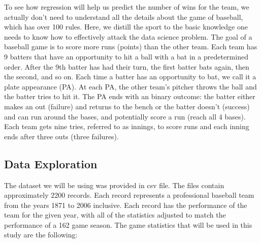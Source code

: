 \documentclass[
]{article}
\begin{document}
To see how regression will help us predict the number of wins for the
team, we actually don't need to understand all the details about the
game of baseball, which has over 100 rules. Here, we distill the sport
to the basic knowledge one needs to know how to effectively attack the
data science problem. The goal of a baseball game is to score more runs
(points) than the other team. Each team has 9 batters that have an
opportunity to hit a ball with a bat in a predetermined order. After the
9th batter has had their turn, the first batter bats again, then the
second, and so on. Each time a batter has an opportunity to bat, we call
it a plate appearance (PA). At each PA, the other team's pitcher throws
the ball and the batter tries to hit it. The PA ends with an binary
outcome: the batter either makes an out (failure) and returns to the
bench or the batter doesn't (success) and can run around the bases, and
potentially score a run (reach all 4 bases). Each team gets nine tries,
referred to as innings, to score runs and each inning ends after three
outs (three failures).

\newpage

\hypertarget{data-exploration}{%
\subsection{Data Exploration}\label{data-exploration}}

The dataset we will be using was provided in csv file. The files contain
approximately 2200 records. Each record represents a professional
baseball team from the years 1871 to 2006 inclusive. Each record has the
performance of the team for the given year, with all of the statistics
adjusted to match the performance of a 162 game season. The game
statistics that will be used in this study are the following:
\end{document}
